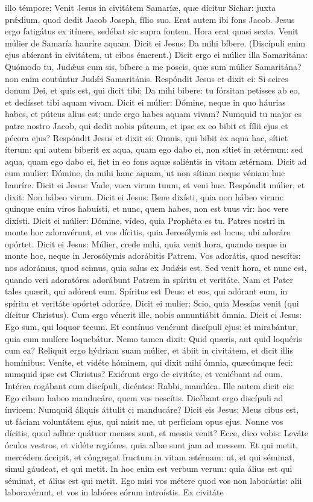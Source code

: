 \begin{paracol}{2}
{ illo témpore: Venit Jesus in civitátem Samaríæ, quæ dícitur Sichar: juxta prǽdium, quod dedit Jacob Joseph, fílio suo. Erat autem ibi fons Jacob. Jesus ergo fatigátus ex itínere, sedébat sic supra fontem. Hora erat quasi sexta. Venit múlier de Samaría hauríre aquam. Dicit ei Jesus: Da mihi bíbere. (Discípuli enim ejus abíerant in civitátem, ut cibos émerent.) Dicit ergo ei múlier illa Samaritána: Quómodo tu, Judǽus cum sis, bíbere a me poscis, quæ sum múlier Samaritána? non enim coutúntur Judǽi Samaritánis. Respóndit Jesus et dixit ei: Si scires donum Dei, et quis est, qui dicit tibi: Da mihi bibere: tu fórsitan petísses ab eo, et dedísset tibi aquam vivam. Dicit ei múlier: Dómine, neque in quo háurias habes, et púteus alius est: unde ergo habes aquam vivam? Numquid tu major es patre nostro Jacob, qui dedit nobis púteum, et ipse ex eo bibit et fílii ejus et pécora ejus? Respóndit Jesus et dixit ei: Omnis, qui bibit ex aqua hac, sítiet íterum: qui autem bíberit ex aqua, quam ego dabo ei, non sítiet in ætérnum: sed aqua, quam ego dabo ei, fiet in eo fons aquæ saliéntis in vitam ætérnam. Dicit ad eum mulier: Dómine, da mihi hanc aquam, ut non sítiam neque véniam huc hauríre. Dicit ei Jesus: Vade, voca virum tuum, et veni huc. Respóndit múlier, et dixit: Non hábeo virum. Dicit ei Jesus: Bene dixísti, quia non hábeo virum: quinque enim viros habuísti, et nunc, quem habes, non est tuus vir: hoc vere dixísti. Dicit ei múlier: Dómine, vídeo, quia Prophéta es tu. Patres nostri in monte hoc adoravérunt, et vos dícitis, quia Jerosólymis est locus, ubi adoráre opórtet. Dicit ei Jesus: Múlier, crede mihi, quia venit hora, quando neque in monte hoc, neque in Jerosólymis adorábitis Patrem. Vos adorátis, quod nescítis: nos adorámus, quod scimus, quia salus ex Judǽis est. Sed venit hora, et nunc est, quando veri adoratóres adorábunt Patrem in spíritu et veritáte. Nam et Pater tales quærit, qui adórent eum. Spíritus est Deus: et eos, qui adórant eum, in spíritu et veritáte opórtet adoráre. Dicit ei mulier: Scio, quia Messías venit (qui dícitur Christus). Cum ergo vénerit ille, nobis annuntiábit ómnia. Dicit ei Jesus: Ego sum, qui loquor tecum. Et contínuo venérunt discípuli ejus: et mirabántur, quia cum mulíere loquebátur. Nemo tamen dixit: Quid quæris, aut quid loquéris cum ea? Reliquit ergo hýdriam suam múlier, et ábiit in civitátem, et dicit illis homínibus: Veníte, et vidéte hóminem, qui dixit mihi ómnia, quæcúmque feci: numquid ipse est Christus? Exiérunt ergo de civitáte, et veniébant ad eum. Intérea rogábant eum discípuli, dicéntes: Rabbi, mandúca. Ille autem dicit eis: Ego cibum habeo manducáre, quem vos nescítis. Dicébant ergo discípuli ad ínvicem: Numquid áliquis áttulit ci manducáre? Dicit eis Jesus: Meus cibus est, ut fáciam voluntátem ejus, qui misit me, ut perfíciam opus ejus. Nonne vos dícitis, quod adhuc quátuor menses sunt, et messis venit? Ecce, dico vobis: Leváte óculos vestros, et vidéte regiónes, quia albæ sunt jam ad messem. Et qui metit, mercédem áccipit, et cóngregat fructum in vitam ætérnam: ut, et qui séminat, simul gáudeat, et qui metit. In hoc enim est verbum verum: quia álius est qui séminat, et álius est qui metit. Ego misi vos métere quod vos non laborástis: alii laboravérunt, et vos in labóres eórum introístis. Ex civitáte }
\end{paracol}
